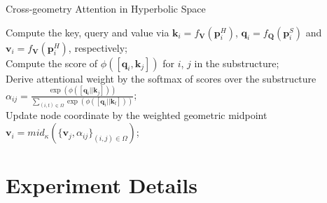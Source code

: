 

\begin{algorithm}[t]
    \caption{Cross-geometry Attention in Hyperbolic Space}
    \label{alg. cross-att}
           Compute the key, query and value via $\boldsymbol k_i=f_{\boldsymbol V}(\boldsymbol p^H_i)$, $\boldsymbol q_i=f_{\boldsymbol Q}(\boldsymbol p^S_i)$ and $\boldsymbol v_i=f_{\boldsymbol V}(\boldsymbol p^H_i)$, respectively;\\
           Compute the score of $\phi([\boldsymbol q_i, \boldsymbol k_j])$ for $i$, $j$ in the substructure;\\
            Derive attentional weight by the softmax of scores over the substructure $\alpha_{ij}=\frac{\exp(\phi([\boldsymbol q_i || \boldsymbol k_j]))}{\sum_{(i,t) \in \Omega}\exp(\phi([\boldsymbol q_i || \boldsymbol k_t]))}$;\\
           Update node coordinate by the weighted geometric midpoint $\boldsymbol v_i=mid_\kappa(\{\boldsymbol v_j, \alpha_{ij}\}_{(i,j) \in \Omega})$;
\end{algorithm}

\vspace{-0.1in}
\section{Experiment Details}

